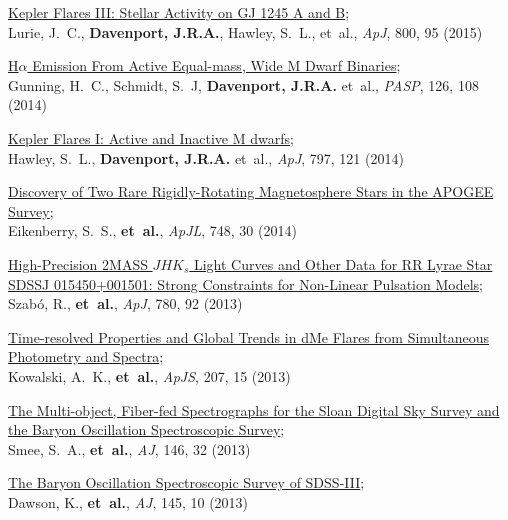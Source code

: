 \begin{etaremune}[leftmargin=10pt]
\item{\sc \href{http://adsabs.harvard.edu/abs/2015ApJ...800...95L}{\color{NavyBlue}Kepler Flares III: Stellar Activity on GJ 1245 A and B}};\\
Lurie, J.~C., {\bf Davenport, J.R.A.}, Hawley, S.~L., et~al., {\em ApJ}, 800, 95 (2015)

\item{\sc \href{http://adsabs.harvard.edu/abs/2014PASP..126.1081G}{\color{NavyBlue}H$\alpha$ Emission From Active Equal-mass, Wide M Dwarf Binaries}};\\
Gunning, H.~C., Schmidt, S.~J, {\bf Davenport, J.R.A.} et~al., {\em PASP}, 126, 108 (2014)

\item{\sc \href{http://arxiv.org/abs/1410.7779}{\color{NavyBlue}Kepler Flares I: Active and Inactive M dwarfs}};\\
Hawley, S.~L., {\bf Davenport, J.R.A.} et~al., {\em ApJ}, 797, 121 (2014)

\item {\sc \href{http://adsabs.harvard.edu/abs/2014ApJ...784L..30E}{\color{NavyBlue}Discovery of Two Rare Rigidly-Rotating Magnetosphere Stars in the APOGEE Survey}};\\
Eikenberry, S.~S., {\bf et~al.}, {\em ApJL}, 748, 30 (2014)

\item {\sc \href{http://adsabs.harvard.edu/abs/2014ApJ...780...92S}{\color{NavyBlue}High-Precision 2MASS $JHK_s$ Light Curves and Other Data for RR Lyrae Star SDSSJ 015450+001501: Strong Constraints for Non-Linear Pulsation Models}};\\
Szab\'{o}, R., {\bf et~al.}, {\em ApJ}, 780, 92 (2013)

\item{\sc \href{http://adsabs.harvard.edu/abs/2013ApJS..207...15K}{\color{NavyBlue}Time-resolved Properties and Global Trends in dMe Flares from Simultaneous Photometry and Spectra}};\\
Kowalski, A.~K., {\bf et~al.}, {\em ApJS}, 207, 15 (2013)

\item {\sc\href{http://adsabs.harvard.edu/abs/2013AJ....146...32S}{\color{NavyBlue}The Multi-object, Fiber-fed Spectrographs for the Sloan Digital Sky Survey and the Baryon Oscillation Spectroscopic Survey}};\\
Smee, S.~A., {\bf et~al.}, {\em AJ}, 146, 32 (2013)

\item {\sc \href{http://adsabs.harvard.edu/abs/2013AJ....145...10D}{\color{NavyBlue}The Baryon Oscillation Spectroscopic Survey of SDSS-III}};\\
Dawson, K., {\bf et~al.}, {\em AJ}, 145, 10 (2013)


\end{etaremune}
